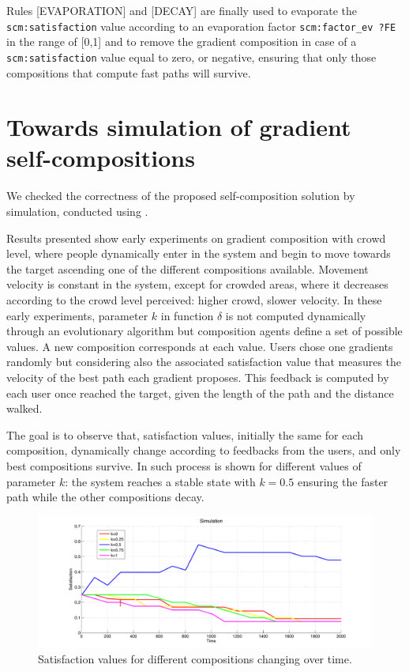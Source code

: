 \documentclass[12pt,a4paper,twoside,openright]{book}
\begin{document}
Rules [EVAPORATION] and [DECAY] are finally used to evaporate the \texttt{scm:satisfaction} value according to an evaporation factor \texttt{scm:factor\_ev ?FE} in the range of [0,1] and to remove the gradient composition in case of a \texttt{scm:satisfaction} value equal to zero, or negative, ensuring that only those compositions that compute fast paths will survive.

\section{Towards simulation of gradient self-compositions}

We checked the correctness of the proposed self-composition solution by simulation, conducted using \alchemist{}.

Results presented show early experiments on gradient composition with crowd level, where people dynamically enter in the system and begin to move towards the target ascending one of the different compositions available. Movement velocity is constant in the system, except for crowded areas, where it decreases according to the crowd level perceived: higher crowd, slower velocity.
%
In these early experiments, parameter $k$ in function $\delta$ is not computed dynamically through an evolutionary algorithm but composition agents define a set of possible values. A new composition corresponds at each value.
%
Users chose one gradients randomly but considering also the associated satisfaction value  that measures the velocity of the best path each gradient proposes. This feedback is computed by each user once reached the target, given the length of the path and the distance walked.

The goal is to observe that, satisfaction values, initially the same for each composition, dynamically change according to feedbacks from the users, and only best compositions survive. In  such process is shown for different values of parameter $k$: the system reaches a stable state with $k=0.5$ ensuring the faster path while the other compositions decay.

\begin{figure}
	\begin{center}
 		\includegraphics[width=\textwidth]{img/sc-simu.pdf}
\end{center}
\caption{Satisfaction values for different compositions changing over time.}
\label{fig:scsimu} 
\end{figure}
\end{document}
